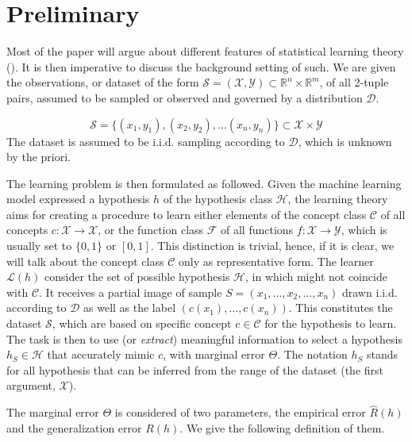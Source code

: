 \documentclass[10pt,oneside,oldfontcommands,dvipsnames,article]{memoir}
\begin{document}
\clearpage

\section{Preliminary}

Most of the paper will argue about different features of statistical learning theory (\cite{Sterkenburg_2024,Vapnik1999-VAPTNO,STL_Hajek_Maxim_2021}). It is then imperative to discuss the background setting of such. We are given the observations, or dataset of the form $\mathcal{S}=(\mathcal{X},\mathcal{Y})\subset \mathbb{R}^{n}\times \mathbb{R}^{m}$, of all 2-tuple pairs, assumed to be sampled or observed and governed by a distribution $\mathcal{D}$. 

\begin{equation*}
    \mathcal{S} = \{ (x_1,y_1), (x_2, y_2),\dots(x_n,y_n) \} \subset \mathcal{X}\times \mathcal{Y}
\end{equation*}
The dataset is assumed to be i.i.d. sampling according to $\mathcal{D}$, which is unknown by the priori. 
\vspace{2mm}

The learning problem is then formulated as followed. Given the machine learning model expressed a hypothesis $h$ of the hypothesis class $\mathcal{H}$, the learning theory aims for creating a procedure to learn either elements of the concept class $\mathcal{C}$ of all concepts $c: \mathcal{X}\to \mathcal{X}$, or the function class $\mathcal{F}$ of all functions $f: \mathcal{X}\to \mathcal{Y}$, which is usually set to $\{0,1\}$ or $[0,1]$. This distinction is trivial, hence, if it is clear, we will talk about the concept class $\mathcal{C}$ only as representative form. The learner $\mathcal{L}(h)$ consider the set of possible hypothesis $\mathcal{H}$, in which might not coincide with $\mathcal{C}$. It receives a partial image of sample $S=(x_{1},\dots,x_{2},\dots,x_n)$ drawn i.i.d. according to $\mathcal{D}$ as well as the label $(c(x_1),\dots,c(x_n))$. This constitutes the dataset $\mathcal{S}$, which are based on specific concept $c\in \mathcal{C}$ for the hypothesis to learn. The task is then to use (or \textit{extract}) meaningful information to select a hypothesis $h_{S}\in \mathcal{H}$ that accurately mimic $c$, with marginal error $\Theta$. The notation $h_{S}$ stands for all hypothesis that can be inferred from the range of the dataset (the first argument, $\mathcal{X}$). 

The marginal error $\Theta$ is considered of two parameters, the empirical error $\hat{R}(h)$ and the generalization error $R(h)$. We give the following definition of them. 
\end{document}
